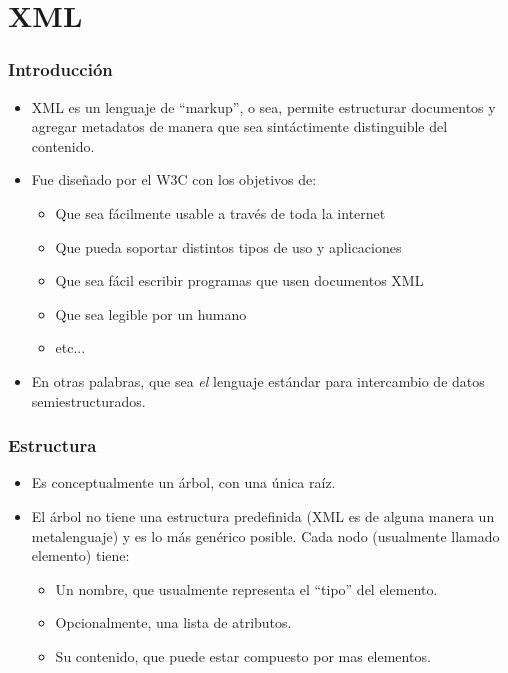 \section{XML}

\begin{frame}
\frametitle{Introducción}
\begin{itemize}

\item	XML es un lenguaje de ``markup'', o sea, permite estructurar documentos
	y agregar metadatos de manera que sea sintáctimente distinguible del
	contenido.
	\pause

\item	Fue diseñado por el W3C con los objetivos de:
\begin{itemize}
	\item	Que sea fácilmente usable a través de toda la internet
	\item	Que pueda soportar distintos tipos de uso y aplicaciones
	\item	Que sea fácil escribir programas que usen documentos XML
	\item	Que sea legible por un humano
	\item	etc...
\end{itemize}
\pause

\item	En otras palabras, que sea {\it el} lenguaje estándar para intercambio
	de datos semiestructurados.
\end{itemize}
\end{frame}

\begin{frame}
\frametitle{Estructura}
\begin{itemize}

\item	Es conceptualmente un árbol, con una única raíz.
\pause

\item	El árbol no tiene una estructura predefinida (XML es de alguna manera
	un metalenguaje) y es lo más genérico posible. Cada nodo (usualmente
	llamado elemento) tiene:
	\pause
\begin{itemize}
	\item	Un nombre, que usualmente representa el ``tipo''
		del elemento.
		\pause
	\item	Opcionalmente, una lista de atributos.
		\pause
	\item	Su contenido, que puede estar compuesto por
		mas elementos.
\end{itemize}

\end{itemize}
\end{frame}

